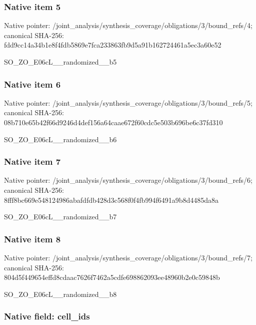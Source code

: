 \documentclass[10pt,a4paper]{article}
\begin{document}
\subsubsection{Native item 5}


Native pointer: /joint\_analysis/synthesi\allowbreak{}s\_coverage/obligations/3\allowbreak{}/bound\_refs/4; canonical SHA-256: fdd9cc14a34b1e8f4fdb5869\allowbreak{}e7fca233863fb9d5a91b1627\allowbreak{}24461a5ec3a60e52


SO\_ZO\_E06cL\_\_randomized\_\_b5


\subsubsection{Native item 6}


Native pointer: /joint\_analysis/synthesi\allowbreak{}s\_coverage/obligations/3\allowbreak{}/bound\_refs/5; canonical SHA-256: 08b710e65b42f66d9246d4de\allowbreak{}f156a64caae672f60cdc5e50\allowbreak{}3b696be6c37fd310


SO\_ZO\_E06cL\_\_randomized\_\_b6


\subsubsection{Native item 7}


Native pointer: /joint\_analysis/synthesi\allowbreak{}s\_coverage/obligations/3\allowbreak{}/bound\_refs/6; canonical SHA-256: 8fff8bc669e548124986abaf\allowbreak{}dfdb428d3c568f0f4fb994f6\allowbreak{}491a9b8d4485da8a


SO\_ZO\_E06cL\_\_randomized\_\_b7


\subsubsection{Native item 8}


Native pointer: /joint\_analysis/synthesi\allowbreak{}s\_coverage/obligations/3\allowbreak{}/bound\_refs/7; canonical SHA-256: 804d5f449654effd8cdaac76\allowbreak{}26f7462a5cdfe698862093ee\allowbreak{}48960b2e0c59848b


SO\_ZO\_E06cL\_\_randomized\_\_b8


\subsubsection{Native field: cell\_ids}
\end{document}
